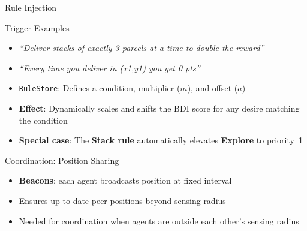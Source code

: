 \begin{frame}{Rule Injection}
  \begin{exampleblock}{Trigger Examples}
    \begin{itemize}
      \item \textit{``Deliver stacks of exactly 3 parcels at a time to double the reward''}
      \item \textit{``Every time you deliver in (x1,y1) you get 0 pts''}
    \end{itemize}
  \end{exampleblock}
  
  \vspace{1em}
  
  \begin{itemize}
    \item \texttt{RuleStore}: Defines a condition, multiplier ($m$), and offset ($a$)
    \item \textbf{Effect}: Dynamically scales and shifts the BDI score for any desire matching the condition
    \item \textbf{Special case}: The \textbf{Stack rule} automatically elevates \textbf{Explore} to priority~1
  \end{itemize}
\end{frame}

\begin{frame}{Coordination: Position Sharing}
  \begin{itemize}
    \item \textbf{Beacons}: each agent broadcasts position at fixed interval
    \item Ensures up-to-date peer positions beyond sensing radius
    \item Needed for coordination when agents are outside each other's sensing radius
  \end{itemize}
\end{frame}

